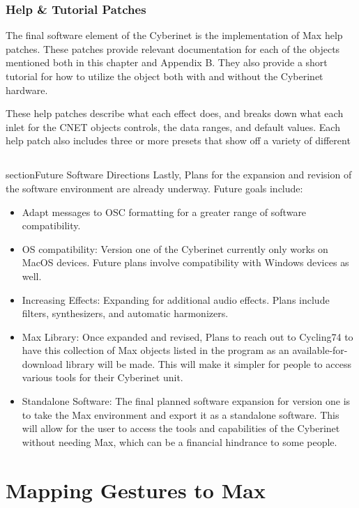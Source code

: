 \subsubsection{Help \& Tutorial Patches}
The final software element of the Cyberinet is the implementation of Max help patches. These patches provide relevant documentation for each of the objects mentioned both in this chapter and Appendix B. They also provide a short tutorial for how to utilize the object both with and without the Cyberinet hardware. 

These help patches describe what each effect does, and breaks down what each inlet for the CNET objects controls, the data ranges, and default values. Each help patch also includes three or more presets that show off a variety of different 


\subsection{}section{Future Software Directions}
Lastly, Plans for the expansion and revision of the software environment are already underway. Future goals include:
\begin{itemize}
    \item Adapt messages to OSC formatting for a greater range of software compatibility.
    \item OS compatibility: Version one of  the Cyberinet currently only works on MacOS devices. Future plans involve compatibility with Windows devices as well.
    \item Increasing Effects: Expanding for additional audio effects. Plans include filters, synthesizers, and automatic harmonizers.
    \item Max Library: Once expanded and revised, Plans to reach out to Cycling74 to have this collection of Max objects listed in the program as an available-for-download library will be made. This will make it simpler for people to access various tools for their Cyberinet unit.
    \item Standalone Software: The final planned software expansion for version one is to take the Max environment and export it as a standalone software. This will allow for the user to access the tools and capabilities of the Cyberinet without needing Max, which can be a financial hindrance to some people.
\end{itemize}

\section{Mapping Gestures to Max} %

